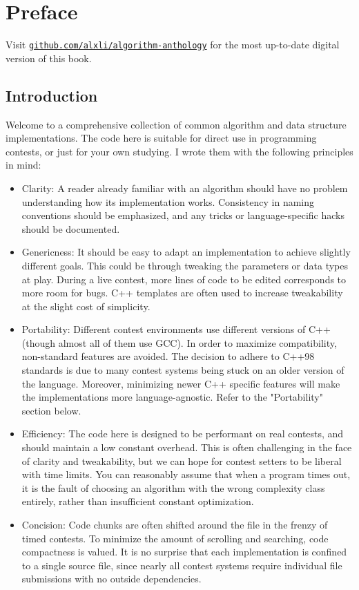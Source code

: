 \chapter{Preface}

\raggedright
\setlength{\parskip}{0.5em}

Visit \href{https://github.com/alxli/algorithm-anthology}{\texttt{github.com/alxli/algorithm-anthology}} for the most up-to-date digital version of this book.

\section*{Introduction}

Welcome to a comprehensive collection of common algorithm and data structure implementations. The code here is suitable for direct use in programming contests, or just for your own studying. I wrote them with the following principles in mind:
\begin{itemize}
	\item Clarity: A reader already familiar with an algorithm should have no problem understanding how its implementation works. Consistency in naming conventions should be emphasized, and any tricks or language-specific hacks should be documented.

	\item Genericness: It should be easy to adapt an implementation to achieve slightly different goals. This could be through tweaking the parameters or data types at play. During a live contest, more lines of code to be edited corresponds to more room for bugs. C++ templates are often used to increase tweakability at the slight cost of simplicity.

	\item Portability: Different contest environments use different versions of C++ (though almost all of them use GCC). In order to maximize compatibility, non-standard features are avoided. The decision to adhere to C++98 standards is due to many contest systems being stuck on an older version of the language. Moreover, minimizing newer C++ specific features will make the implementations more language-agnostic. Refer to the "Portability" section below.

	\item Efficiency: The code here is designed to be performant on real contests, and should maintain a low constant overhead. This is often challenging in the face of clarity and tweakability, but we can hope for contest setters to be liberal with time limits. You can reasonably assume that when a program times out, it is the fault of choosing an algorithm with the wrong complexity class entirely, rather than insufficient constant optimization.

	\item Concision: Code chunks are often shifted around the file in the frenzy of timed contests. To minimize the amount of scrolling and searching, code compactness is valued. It is no surprise that each implementation is confined to a single source file, since nearly all contest systems require individual file submissions with no outside dependencies.
\end{itemize}

